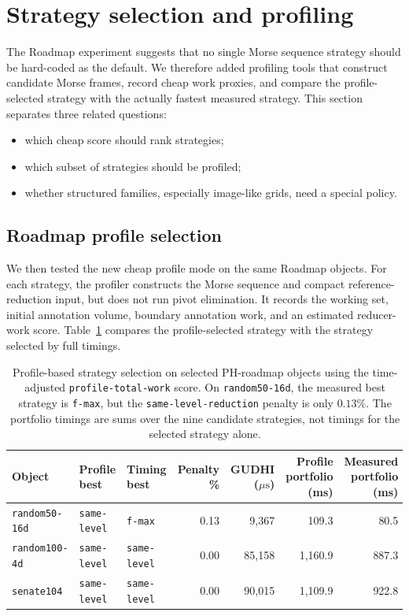 \documentclass[11pt]{article}
\newcommand{\us}{\ensuremath{\mu\mathrm{s}}}
\newcommand{\slred}{\texttt{same-level}}
\begin{document}
\section{Strategy selection and profiling}

The Roadmap experiment suggests that no single Morse sequence strategy should be hard-coded
as the default.  We therefore added profiling tools that construct candidate Morse frames,
record cheap work proxies, and compare the profile-selected strategy with the actually
fastest measured strategy.  This section separates three related questions:
\begin{itemize}
  \item which cheap score should rank strategies;
  \item which subset of strategies should be profiled;
  \item whether structured families, especially image-like grids, need a special policy.
\end{itemize}

\subsection{Roadmap profile selection}
We then tested the new cheap profile mode on the same Roadmap objects.  For each strategy,
the profiler constructs the Morse sequence and compact reference-reduction input, but does
not run pivot elimination.  It records the working set, initial annotation volume, boundary
annotation work, and an estimated reducer-work score.  Table~\ref{tab:roadmap-profile}
compares the profile-selected strategy with the strategy selected by full timings.

\begin{table}[ht]
\centering
\scriptsize
\setlength{\tabcolsep}{3pt}
\begin{tabular}{lllrrrr}
\toprule
Object & Profile best & Timing best & Penalty \% & GUDHI (\us) & Profile portfolio (ms) & Measured portfolio (ms) \\
\midrule
\texttt{random50-16d}  & \slred & \texttt{f-max} & 0.13 & 9,367  & 109.3 & 80.5 \\
\texttt{random100-4d} & \slred & \slred         & 0.00 & 85,158 & 1,160.9 & 887.3 \\
\texttt{senate104}    & \slred & \slred         & 0.00 & 90,015 & 1,109.9 & 922.8 \\
\bottomrule
\end{tabular}
\caption{Profile-based strategy selection on selected PH-roadmap objects using the
time-adjusted \texttt{profile-total-work} score.  On \texttt{random50-16d}, the measured
best strategy is \texttt{f-max}, but the \texttt{same-level-reduction} penalty is only
$0.13\%$.  The portfolio timings are sums over the nine candidate strategies, not timings
for the selected strategy alone.}
\label{tab:roadmap-profile}
\end{table}
\end{document}
